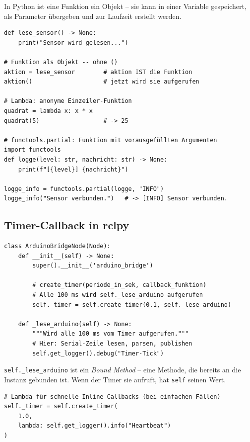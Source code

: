 \begin{wissenBox}
In Python ist eine Funktion ein Objekt -- sie kann in einer Variable
gespeichert, als Parameter übergeben und zur Laufzeit erstellt werden.

\begin{lstlisting}
def lese_sensor() -> None:
    print("Sensor wird gelesen...")

# Funktion als Objekt -- ohne ()
aktion = lese_sensor        # aktion IST die Funktion
aktion()                    # jetzt wird sie aufgerufen

# Lambda: anonyme Einzeiler-Funktion
quadrat = lambda x: x * x
quadrat(5)                  # -> 25

# functools.partial: Funktion mit vorausgefüllten Argumenten
import functools
def logge(level: str, nachricht: str) -> None:
    print(f"[{level}] {nachricht}")

logge_info = functools.partial(logge, "INFO")
logge_info("Sensor verbunden.")   # -> [INFO] Sensor verbunden.
\end{lstlisting}
\end{wissenBox}

\subsection{Timer-Callback in rclpy}

\begin{lstlisting}
class ArduinoBridgeNode(Node):
    def __init__(self) -> None:
        super().__init__('arduino_bridge')

        # create_timer(periode_in_sek, callback_funktion)
        # Alle 100 ms wird self._lese_arduino aufgerufen
        self._timer = self.create_timer(0.1, self._lese_arduino)

    def _lese_arduino(self) -> None:
        """Wird alle 100 ms vom Timer aufgerufen."""
        # Hier: Serial-Zeile lesen, parsen, publishen
        self.get_logger().debug("Timer-Tick")
\end{lstlisting}

\texttt{self.\_lese\_arduino} ist ein \emph{Bound Method} --
eine Methode, die bereits an die Instanz gebunden ist.
Wenn der Timer sie aufruft, hat \texttt{self} seinen Wert.

\begin{lstlisting}
# Lambda für schnelle Inline-Callbacks (bei einfachen Fällen)
self._timer = self.create_timer(
    1.0,
    lambda: self.get_logger().info("Heartbeat")
)
\end{lstlisting}


